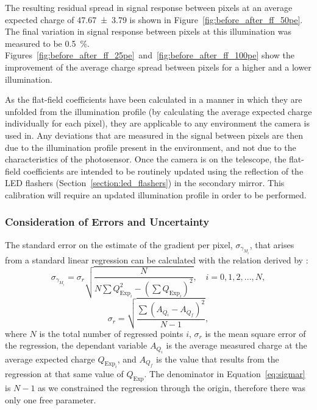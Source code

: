 The resulting residual spread in signal response between pixels at an average expected charge of \SI[separate-uncertainty = true]{47.67 \pm 3.79}{\pe} is shown in Figure~\ref{fig:before_after_ff_50pe}. The final variation in signal response between pixels at this illumination was measured to be \SI{0.5}{\percent}. Figures~\ref{fig:before_after_ff_25pe}~and~\ref{fig:before_after_ff_100pe} show the improvement of the average charge spread between pixels for a higher and a lower illumination.

As the flat-field coefficients have been calculated in a manner in which they are unfolded from the illumination profile (by calculating the average expected charge individually for each pixel), they are applicable to any environment the camera is used in. Any deviations that are measured in the signal between pixels are then due to the illumination profile present in the environment, and not due to the characteristics of the photosensor. Once the camera is on the telescope, the flat-field coefficients are intended to be routinely updated using the reflection of the LED flashers (Section~\ref{section:led_flashers}) in the secondary mirror. This calibration will require an updated illumination profile in order to be performed.

\subsubsection{Consideration of Errors and Uncertainty}

The standard error on the estimate of the gradient per pixel, $\sigma_{\gamma_{M_i}}$, that arises from a standard linear regression can be calculated with the relation derived by \textcite{Taylor1997}:
\begin{equation} \label{eq:merr}
\sigma_{\gamma_{M_i}} = \sigma_r \sqrt{\frac{N}{N \sum Q_{\text{Exp}_i}^2 - (\sum Q_{\text{Exp}_i})^2}}, \quad i = 0, 1, 2, ..., N,
\end{equation}
\begin{equation} \label{eq:sigmar}
\sigma_r = \sqrt{\frac{\sum (A_{Q_i} - A_{Q_f})^2}{N - 1}},
\end{equation}
where $N$ is the total number of regressed points $i$, $\sigma_r$ is the mean square error of the regression, the dependant variable $A_{Q_i}$ is the average measured charge at the average expected charge $Q_{\text{Exp}_i}$, and $A_{Q_f}$ is the value that results from the regression at that same value of $Q_\text{Exp}$. The denominator in Equation~\ref{eq:sigmar} is $N-1$ as we constrained the regression through the origin, therefore there was only one free parameter.

